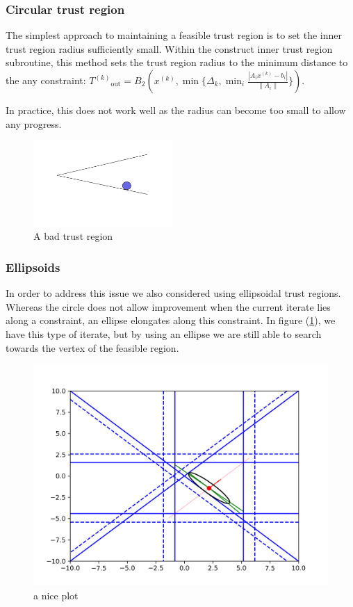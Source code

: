 \documentclass{article}
\theoremstyle{case}
\newcommand{\iteratek}{{x}^{(k)}}
\newcommand{\outertrk}{{T^{(k)}}_{\text{out}}}
\let\oldref\ref
\renewcommand{\ref}[1]{(\oldref{#1})}
\begin{document}
\subsubsection{Circular trust region}
The simplest approach to maintaining a feasible trust region is to set the inner trust region radius sufficiently small.
Within the construct inner trust region subroutine, this method sets the trust region radius to the minimum distance to the any constraint:
$\outertrk = B_2(\iteratek, \min\{\Delta_k, \min_{i}\frac{|A_i\iteratek - b_i|}{\|A_i\|} \})$.

In practice, this does not work well as the radius can become too small to allow any progress.

\begin{figure}[h]
    \centering
    \includegraphics[width=200px]{images/BAD_CIRCLE.png}
    \caption{A bad trust region}
\end{figure}


    
\subsubsection{Ellipsoids}

In order to address this issue we also considered using ellipsoidal trust regions.
Whereas the circle does not allow improvement when the current iterate lies along a constraint, an ellipse elongates along this constraint.
In figure \ref{ellipse_adv}, we have this type of iterate, but by using an ellipse we are still able to search towards the vertex of the feasible region.
\begin{figure}[h]
    \centering
    \includegraphics[scale=0.4]{images/advantage_of_ellipse_2.png}
    \caption{a nice plot}
    \label{ellipse_adv}
\end{figure}
\end{document}

